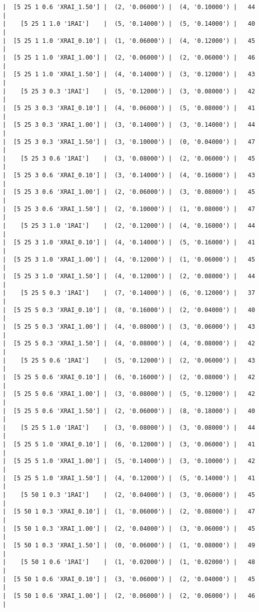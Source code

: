 \documentclass{article}
\begin{document}
\begin{verbatim}
|  [5 25 1 0.6 'XRAI_1.50'] |  (2, '0.06000') |  (4, '0.10000') |   44  |
|    [5 25 1 1.0 '1RAI']    |  (5, '0.14000') |  (5, '0.14000') |   40  |
|  [5 25 1 1.0 'XRAI_0.10'] |  (1, '0.06000') |  (4, '0.12000') |   45  |
|  [5 25 1 1.0 'XRAI_1.00'] |  (2, '0.06000') |  (2, '0.06000') |   46  |
|  [5 25 1 1.0 'XRAI_1.50'] |  (4, '0.14000') |  (3, '0.12000') |   43  |
|    [5 25 3 0.3 '1RAI']    |  (5, '0.12000') |  (3, '0.08000') |   42  |
|  [5 25 3 0.3 'XRAI_0.10'] |  (4, '0.06000') |  (5, '0.08000') |   41  |
|  [5 25 3 0.3 'XRAI_1.00'] |  (3, '0.14000') |  (3, '0.14000') |   44  |
|  [5 25 3 0.3 'XRAI_1.50'] |  (3, '0.10000') |  (0, '0.04000') |   47  |
|    [5 25 3 0.6 '1RAI']    |  (3, '0.08000') |  (2, '0.06000') |   45  |
|  [5 25 3 0.6 'XRAI_0.10'] |  (3, '0.14000') |  (4, '0.16000') |   43  |
|  [5 25 3 0.6 'XRAI_1.00'] |  (2, '0.06000') |  (3, '0.08000') |   45  |
|  [5 25 3 0.6 'XRAI_1.50'] |  (2, '0.10000') |  (1, '0.08000') |   47  |
|    [5 25 3 1.0 '1RAI']    |  (2, '0.12000') |  (4, '0.16000') |   44  |
|  [5 25 3 1.0 'XRAI_0.10'] |  (4, '0.14000') |  (5, '0.16000') |   41  |
|  [5 25 3 1.0 'XRAI_1.00'] |  (4, '0.12000') |  (1, '0.06000') |   45  |
|  [5 25 3 1.0 'XRAI_1.50'] |  (4, '0.12000') |  (2, '0.08000') |   44  |
|    [5 25 5 0.3 '1RAI']    |  (7, '0.14000') |  (6, '0.12000') |   37  |
|  [5 25 5 0.3 'XRAI_0.10'] |  (8, '0.16000') |  (2, '0.04000') |   40  |
|  [5 25 5 0.3 'XRAI_1.00'] |  (4, '0.08000') |  (3, '0.06000') |   43  |
|  [5 25 5 0.3 'XRAI_1.50'] |  (4, '0.08000') |  (4, '0.08000') |   42  |
|    [5 25 5 0.6 '1RAI']    |  (5, '0.12000') |  (2, '0.06000') |   43  |
|  [5 25 5 0.6 'XRAI_0.10'] |  (6, '0.16000') |  (2, '0.08000') |   42  |
|  [5 25 5 0.6 'XRAI_1.00'] |  (3, '0.08000') |  (5, '0.12000') |   42  |
|  [5 25 5 0.6 'XRAI_1.50'] |  (2, '0.06000') |  (8, '0.18000') |   40  |
|    [5 25 5 1.0 '1RAI']    |  (3, '0.08000') |  (3, '0.08000') |   44  |
|  [5 25 5 1.0 'XRAI_0.10'] |  (6, '0.12000') |  (3, '0.06000') |   41  |
|  [5 25 5 1.0 'XRAI_1.00'] |  (5, '0.14000') |  (3, '0.10000') |   42  |
|  [5 25 5 1.0 'XRAI_1.50'] |  (4, '0.12000') |  (5, '0.14000') |   41  |
|    [5 50 1 0.3 '1RAI']    |  (2, '0.04000') |  (3, '0.06000') |   45  |
|  [5 50 1 0.3 'XRAI_0.10'] |  (1, '0.06000') |  (2, '0.08000') |   47  |
|  [5 50 1 0.3 'XRAI_1.00'] |  (2, '0.04000') |  (3, '0.06000') |   45  |
|  [5 50 1 0.3 'XRAI_1.50'] |  (0, '0.06000') |  (1, '0.08000') |   49  |
|    [5 50 1 0.6 '1RAI']    |  (1, '0.02000') |  (1, '0.02000') |   48  |
|  [5 50 1 0.6 'XRAI_0.10'] |  (3, '0.06000') |  (2, '0.04000') |   45  |
|  [5 50 1 0.6 'XRAI_1.00'] |  (2, '0.06000') |  (2, '0.06000') |   46  |

\end{verbatim}
\end{document}
